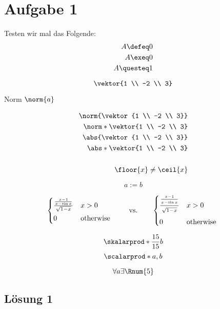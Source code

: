 \documentclass[main.tex]{subfiles}
\begin{document}
\section{Aufgabe 1}

Testen wir mal das Folgende:
\begin{align*}
    A \defeq 0 \\
    A \exeq 0 \\
    A \questeq 1 \\
\end{align*}

\[
    \vektor{1 \\ -2 \\ 3}
\]

Norm $\norm{a}$

\begin{align}
    \norm{\vektor{1 \\ -2 \\ 3}}\\
    \norm*{\vektor{1 \\ -2 \\ 3}}\\
    \abs{\vektor{1 \\ -2 \\ 3}}\\
    \abs*{\vektor{1 \\ -2 \\ 3}}\\
    \\
    \floor{x} \neq \ceil{x}
\end{align}

\[
    a := b
\]

\[ \begin{cases*}
    \frac{ \frac{ x-1 }{ x-\sin x } }{ \sqrt{ 1-x } } & $x>0$ \\
    0 & otherwise
    \end{cases*}
    \qquad\text{vs.}\qquad
    \begin{cases*}
    \frac{ \frac{ \xmathstrut{0.1} x-1 }
    { \xmathstrut{0.25} x-\sin x } }
    {\xmathstrut{0.4} \sqrt{ 1-x } } & $x>0$ \\
    0 & otherwise
    \end{cases*} \]

\[\skalarprod*{\frac{15}{15}}{b}\]
\[\scalarprod*{a, b}\]

\[\forall a \exists \Rnum{5}\]

\subsection{Lösung 1}
\end{document}
